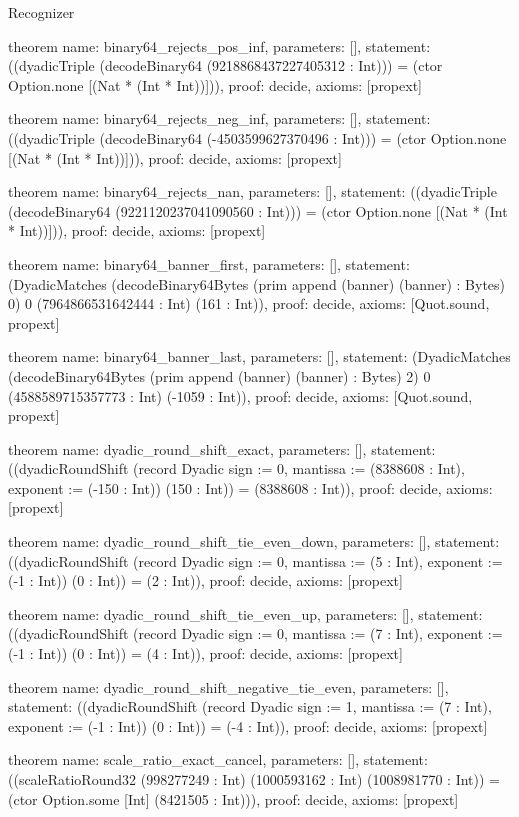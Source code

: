 \begin{lexlean}{Recognizer}
\begin{semanticmodule}
theorem{
  name: binary64_rejects_pos_inf,
  parameters: [],
  statement: ((dyadicTriple (decodeBinary64 (9218868437227405312 : Int))) = (ctor Option.none [(Nat * (Int * Int))])),
  proof: decide{},
  axioms: [propext]
}

theorem{
  name: binary64_rejects_neg_inf,
  parameters: [],
  statement: ((dyadicTriple (decodeBinary64 (-4503599627370496 : Int))) = (ctor Option.none [(Nat * (Int * Int))])),
  proof: decide{},
  axioms: [propext]
}

theorem{
  name: binary64_rejects_nan,
  parameters: [],
  statement: ((dyadicTriple (decodeBinary64 (9221120237041090560 : Int))) = (ctor Option.none [(Nat * (Int * Int))])),
  proof: decide{},
  axioms: [propext]
}

theorem{
  name: binary64_banner_first,
  parameters: [],
  statement: (DyadicMatches (decodeBinary64Bytes (prim append (banner) (banner) : Bytes) 0) 0 (7964866531642444 : Int) (161 : Int)),
  proof: decide{},
  axioms: [Quot.sound, propext]
}

theorem{
  name: binary64_banner_last,
  parameters: [],
  statement: (DyadicMatches (decodeBinary64Bytes (prim append (banner) (banner) : Bytes) 2) 0 (4588589715357773 : Int) (-1059 : Int)),
  proof: decide{},
  axioms: [Quot.sound, propext]
}

theorem{
  name: dyadic_round_shift_exact,
  parameters: [],
  statement: ((dyadicRoundShift (record Dyadic {sign := 0, mantissa := (8388608 : Int), exponent := (-150 : Int)}) (150 : Int)) = (8388608 : Int)),
  proof: decide{},
  axioms: [propext]
}

theorem{
  name: dyadic_round_shift_tie_even_down,
  parameters: [],
  statement: ((dyadicRoundShift (record Dyadic {sign := 0, mantissa := (5 : Int), exponent := (-1 : Int)}) (0 : Int)) = (2 : Int)),
  proof: decide{},
  axioms: [propext]
}

theorem{
  name: dyadic_round_shift_tie_even_up,
  parameters: [],
  statement: ((dyadicRoundShift (record Dyadic {sign := 0, mantissa := (7 : Int), exponent := (-1 : Int)}) (0 : Int)) = (4 : Int)),
  proof: decide{},
  axioms: [propext]
}

theorem{
  name: dyadic_round_shift_negative_tie_even,
  parameters: [],
  statement: ((dyadicRoundShift (record Dyadic {sign := 1, mantissa := (7 : Int), exponent := (-1 : Int)}) (0 : Int)) = (-4 : Int)),
  proof: decide{},
  axioms: [propext]
}

theorem{
  name: scale_ratio_exact_cancel,
  parameters: [],
  statement: ((scaleRatioRound32 (998277249 : Int) (1000593162 : Int) (1008981770 : Int)) = (ctor Option.some [Int] (8421505 : Int))),
  proof: decide{},
  axioms: [propext]
}


\end{semanticmodule}
\end{lexlean}
